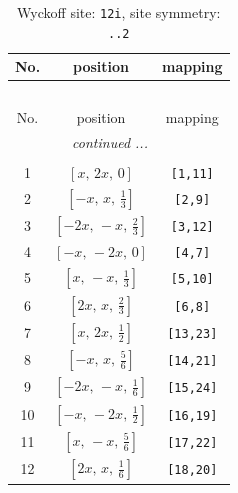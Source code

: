 \documentclass[fleqn,8pt]{jsarticle}
\begin{document}
\begin{longtable}{ccc}
\caption{Wyckoff site: {\tt 12i}, site symmetry: {\tt ..2}}
 \\
 \hline \hline
No. & position & mapping \\ \hline \endfirsthead

\multicolumn{2}{l}{\tablename\ \thetable{}} \\
 \hline \hline
No. & position & mapping \\ \hline \endhead

 \hline \hline
\multicolumn{2}{r}{\footnotesize\it continued ...} \\ \endfoot

 \hline \hline
\multicolumn{2}{r}{} \\ \endlastfoot

1 & $\left[ x,\, 2 x,\, 0 \right]$ & {\tt [1,11]} \\ \hline
2 & $\left[ - x,\, x,\, \frac{1}{3} \right]$ & {\tt [2,9]} \\ \hline
3 & $\left[ - 2 x,\, - x,\, \frac{2}{3} \right]$ & {\tt [3,12]} \\ \hline
4 & $\left[ - x,\, - 2 x,\, 0 \right]$ & {\tt [4,7]} \\ \hline
5 & $\left[ x,\, - x,\, \frac{1}{3} \right]$ & {\tt [5,10]} \\ \hline
6 & $\left[ 2 x,\, x,\, \frac{2}{3} \right]$ & {\tt [6,8]} \\ \hline
7 & $\left[ x,\, 2 x,\, \frac{1}{2} \right]$ & {\tt [13,23]} \\ \hline
8 & $\left[ - x,\, x,\, \frac{5}{6} \right]$ & {\tt [14,21]} \\ \hline
9 & $\left[ - 2 x,\, - x,\, \frac{1}{6} \right]$ & {\tt [15,24]} \\ \hline
10 & $\left[ - x,\, - 2 x,\, \frac{1}{2} \right]$ & {\tt [16,19]} \\ \hline
11 & $\left[ x,\, - x,\, \frac{5}{6} \right]$ & {\tt [17,22]} \\ \hline
12 & $\left[ 2 x,\, x,\, \frac{1}{6} \right]$ & {\tt [18,20]} \\
\end{longtable}
\renewcommand{\arraystretch}{1.2}
\end{document}
